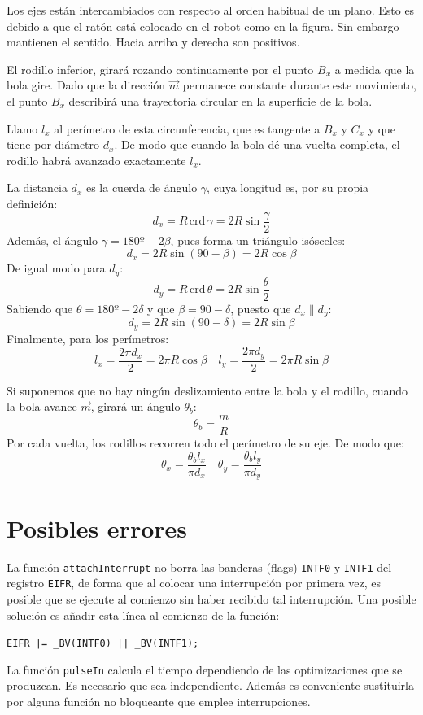 \documentclass[10pt,a4paper,hidelinks]{article}
\begin{document}
\begin{multicols}{2}
Los ejes están intercambiados con respecto al orden habitual de un plano. Esto 
es debido a que el ratón está colocado en el robot como en la figura. Sin 
embargo mantienen el sentido. Hacia arriba y derecha son positivos.

El rodillo inferior, girará rozando continuamente por el punto $B_x$ a medida 
que la bola gire. Dado que la dirección $\vec{m}$ permanece constante durante 
este movimiento, el punto $B_x$ describirá una trayectoria circular en la 
superficie de la bola.

Llamo $l_x$ al perímetro de esta circunferencia, que es tangente a $B_x$ y $C_x$ 
y que tiene por diámetro $d_x$. De modo que cuando la bola dé una vuelta 
completa, el rodillo habrá avanzado exactamente $l_x$.

La distancia $d_x$ es la cuerda de ángulo $\gamma$, cuya longitud es, por su 
propia definición:
$$ d_x = R \, \text{crd} \, \gamma = 2R \sin \frac{\gamma}{2}$$
Además, el ángulo $\gamma = 180º - 2\beta$, pues forma un triángulo isósceles:
$$ d_x = 2R \sin(90-\beta) = 2R\cos \beta$$
De igual modo para $d_y$:
$$ d_y = R \, \text{crd} \, \theta = 2R \sin \frac{\theta}{2} $$
Sabiendo que $\theta = 180º - 2\delta$ y que $\beta = 90 - \delta$, puesto que 
$d_x \parallel d_y$:
$$ d_y = 2R \sin (90 - \delta) = 2R \sin \beta $$
Finalmente, para los perímetros:
$$ l_x = \frac{2\pi d_x}{2} = 2 \pi R\cos \beta \quad  l_y = \frac{2\pi d_y}{2} 
= 2 \pi R\sin \beta $$

Si suponemos que no hay ningún deslizamiento entre la bola y el rodillo, cuando 
la bola avance $\vec{m}$, girará un ángulo $\theta_b$:
$$ \theta_b = \frac{m}{R} $$
Por cada vuelta, los rodillos recorren todo el perímetro de su eje. De modo que:
$$ \theta_x = \frac{\theta_b l_x}{\pi d_x} \quad
	\theta_y = \frac{\theta_b l_y}{\pi d_y}$$



\section{Posibles errores}

La función \texttt{attachInterrupt} no borra las banderas (flags) \texttt{INTF0} 
y \texttt{INTF1} del registro \texttt{EIFR}, de forma que al colocar una 
interrupción por primera vez, es posible que se ejecute al comienzo sin haber 
recibido tal interrupción. Una posible solución es añadir esta línea al comienzo 
de la función:

\texttt{EIFR |= \_BV(INTF0) || \_BV(INTF1);}

La función \texttt{pulseIn} calcula el tiempo dependiendo de las optimizaciones
que se produzcan. Es necesario que sea independiente. Además es conveniente
sustituirla por alguna función no bloqueante que emplee interrupciones.
\\

\end{multicols}
\end{document}
